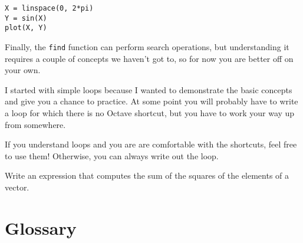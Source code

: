 \begin{verbatim}
X = linspace(0, 2*pi)
Y = sin(X)
plot(X, Y)
\end{verbatim}

Finally, the {\tt find} function can perform search operations, but
understanding it requires a couple of concepts we haven't got to, so
for now you are better off on your own.

I started with simple loops because I wanted to demonstrate the basic
concepts and give you a chance to practice. At some point you will
probably have to write a loop for which there is no 
Octave shortcut, but you have to work your way up from somewhere.

If you understand loops and you are are comfortable with the
shortcuts, feel free to use them! Otherwise, you can always write
out the loop.

\begin{ex}
Write an expression that computes the sum of the
squares of the elements of a vector.
\end{ex}


\section{Glossary}

